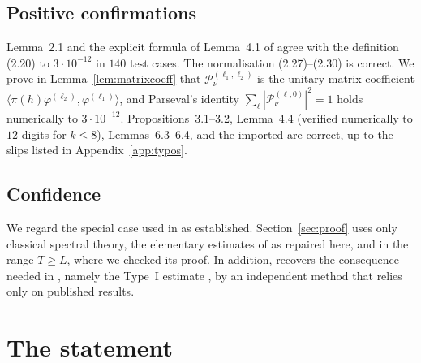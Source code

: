 \documentclass[11pt]{amsart}
\theoremstyle{remark}
\theoremstyle{definition}
\numberwithin{equation}{section}
\newcommand{\br}[1]{\langle #1\rangle}
\newcommand{\Pc}{\mathcal{P}}
\begin{document}
\subsection*{Positive confirmations}
Lemma~2.1 and the explicit formula of Lemma~4.1 of \cite{GM1} agree with the definition (2.20) to $3\cdot10^{-12}$ in $140$ test cases. The normalisation (2.27)--(2.30) is correct. We prove in Lemma~\ref{lem:matrixcoeff} that $\Pc^{(\ell_1,\ell_2)}_\nu$ is the unitary matrix coefficient $\br{\pi(h)\varphi^{(\ell_2)},\varphi^{(\ell_1)}}$, and Parseval's identity $\sum_{\ell}|\Pc^{(\ell,0)}_\nu|^2=1$ holds numerically to $3\cdot10^{-12}$. Propositions~3.1--3.2, Lemma~4.4 (verified numerically to $12$ digits for $k\le8$), Lemmas~6.3--6.4, and the imported \cite[Propositions~5.1, 5.2, Lemmas~6.2--6.4, \S7.3]{GM0} are correct, up to the slips listed in Appendix~\ref{app:typos}.

\subsection*{Confidence}
We regard the special case used in \cite{II} as established. Section~\ref{sec:proof} uses only classical spectral theory, the elementary estimates of \cite[\S\S4--6]{GM1} as repaired here, and \cite[Proposition~6.1]{GM0} in the range $T\ge L$, where we checked its proof. In addition, \cite{KUZ} recovers the consequence needed in \cite{II}, namely the Type~I estimate \cite[Proposition~6.5]{II}, by an independent method that relies only on published results.

\section{The statement}\label{sec:statement}
\end{document}
